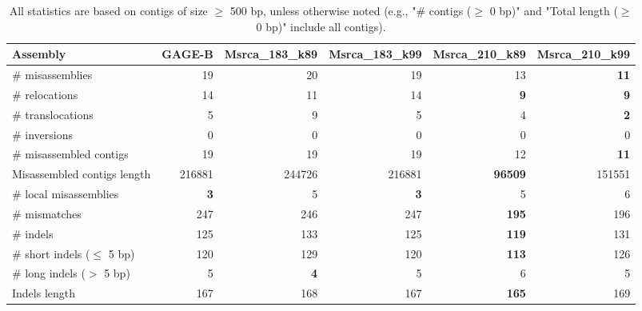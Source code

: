\documentclass[12pt,a4paper]{article}
\begin{document}
\begin{table}[ht]
\begin{center}
\caption{All statistics are based on contigs of size $\geq$ 500 bp, unless otherwise noted (e.g., "\# contigs ($\geq$ 0 bp)" and "Total length ($\geq$ 0 bp)" include all contigs).}
\begin{tabular}{|l*{5}{|r}|}
\hline
Assembly & GAGE-B & Msrca\_183\_k89 & Msrca\_183\_k99 & Msrca\_210\_k89 & Msrca\_210\_k99 \\ \hline
\# misassemblies & 19 & 20 & 19 & 13 & {\bf 11} \\ \hline
\hspace{5mm}\# relocations & 14 & 11 & 14 & {\bf 9} & {\bf 9} \\ \hline
\hspace{5mm}\# translocations & 5 & 9 & 5 & 4 & {\bf 2} \\ \hline
\hspace{5mm}\# inversions & 0 & 0 & 0 & 0 & 0 \\ \hline
\# misassembled contigs & 19 & 19 & 19 & 12 & {\bf 11} \\ \hline
Misassembled contigs length & 216881 & 244726 & 216881 & {\bf 96509} & 151551 \\ \hline
\# local misassemblies & {\bf 3} & 5 & {\bf 3} & 5 & 6 \\ \hline
\# mismatches & 247 & 246 & 247 & {\bf 195} & 196 \\ \hline
\# indels & 125 & 133 & 125 & {\bf 119} & 131 \\ \hline
\hspace{5mm}\# short indels ($\leq$ 5 bp) & 120 & 129 & 120 & {\bf 113} & 126 \\ \hline
\hspace{5mm}\# long indels ($>$ 5 bp) & 5 & {\bf 4} & 5 & 6 & 5 \\ \hline
Indels length & 167 & 168 & 167 & {\bf 165} & 169 \\ \hline
\end{tabular}
\end{center}
\end{table}
\end{document}

